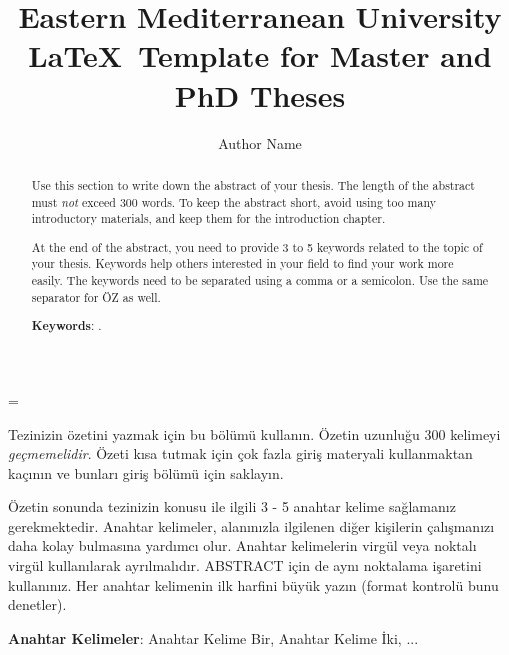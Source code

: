 \documentclass[a4paper,12pt,oneside]{report}
\title{Eastern Mediterranean University \LaTeX~Template for Master and PhD Theses}
\author{Author Name}
\begin{document}

\emergencystretch=\maxdimen
{}

\makethesistitle
\makeapprovalpage

\begin{abstract}
Use this section to write down the abstract of your thesis. The length of the abstract must \textit{not} exceed 300 words. To keep the abstract short, avoid using too many introductory materials, and keep them for the introduction chapter.

At the end of the abstract, you need to provide 3 to 5 keywords related to the topic of your thesis. Keywords help others interested in your field to find your work more easily. The keywords need to be separated using a comma or a semicolon. Use the same separator for ÖZ as well.

\noindent \textbf{Keywords}: .
\end{abstract}

\begin{ozet}
Tezinizin özetini yazmak için bu bölümü kullanın. Özetin uzunluğu 300 kelimeyi \textit{geçmemelidir}. Özeti kısa tutmak için çok fazla giriş materyali kullanmaktan kaçının ve bunları giriş bölümü için saklayın.

Özetin sonunda tezinizin konusu ile ilgili 3 - 5 anahtar kelime sağlamanız gerekmektedir. Anahtar kelimeler, alanınızla ilgilenen diğer kişilerin çalışmanızı daha kolay bulmasına yardımcı olur. Anahtar kelimelerin virgül veya noktalı virgül kullanılarak ayrılmalıdır. ABSTRACT için de aynı noktalama işaretini kullanınız. Her anahtar kelimenin ilk harfini büyük yazın (format kontrolü bunu denetler).

\noindent \textbf{Anahtar Kelimeler}: Anahtar Kelime Bir, Anahtar Kelime İki, ...
\end{ozet}
\end{document}
